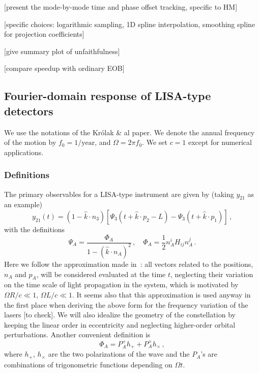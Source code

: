 \documentclass[aps,showpacs,%
prd,superscriptaddress,nofootinbib]{revtex4}
\newcommand{\be}{\begin{equation}}
\newcommand{\ee}{\end{equation}}
\newcommand{\hatk}{\hat{k}}
\begin{document}
[present the mode-by-mode time and phase offset tracking, specific to HM]

[specific choices: logarithmic sampling, 1D spline interpolation, smoothing spline for projection coefficients]

[give summary plot of unfaithfulness]

[compare speedup with ordinary EOB]


\subsection{Fourier-domain response of LISA-type detectors}
\label{subsec:fdresponse}

We use the notations of the Kr\'olak \& al paper. We denote the annual frequency of the motion by $f_{0}=1/\mathrm{year}$, and $\Omega = 2\pi f_{0}$. We set $c=1$ except for numerical applications.


\subsubsection*{Definitions}

The primary observables for a LISA-type instrument are given by (taking $y_{21}$ as an example)
%
\be
	y_{21}(t) = \left( 1-\hatk \cdot n_{3}\right) \left[ \Psi_{3}(t+\hatk\cdot p_{2} - L) - \Psi_{3}(t+\hatk\cdot p_{1}) \right] \,,
\ee
%
with the definitions
%
\be
	\Psi_{A} = \frac{\Phi_{A}}{1-(\hatk\cdot n_{A})^{2}} \,, \quad \Phi_{A} = \frac{1}{2} n_{A}^{i} H_{ij} n_{A}^{j} \,.
\ee
%
Here we follow the approximation made in~\cite{Krolak+04}: all vectors related to the positions, $n_{A}$ and $p_{A}$, will be considered evaluated at the time $t$, neglecting their variation on the time scale of light propagation in the system, which is motivated by $\Omega R/c \ll 1$, $\Omega L/c\ll 1$. It seems also that this approximation is used anyway in the first place when deriving the above form for the frequency variation of the lasers [to check]. We will also idealize the geometry of the constellation by keeping the linear order in eccentricity and neglecting higher-order orbital perturbations. Another convenient definition is
%
\be
	\Phi_{A} = P_{A}^{+} h_{+} + P_{A}^{\times}h_{\times} \,,
\ee
%
where $h_{+}$, $h_{\times}$ are the two polarizations of the wave and the $P_{A}$'s are combinations of trigonometric functions depending on $\Omega t$. 
\end{document}
